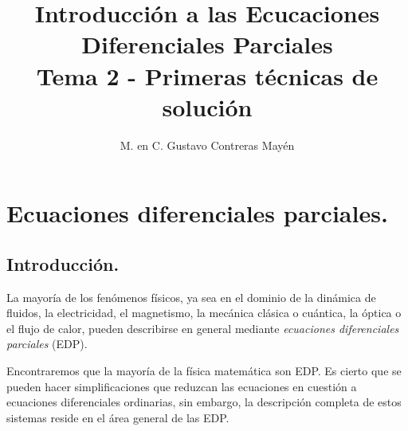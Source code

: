 
\title{Introducción a las Ecucaciones Diferenciales Parciales \\[0.3em]  \large{Tema 2 - Primeras técnicas de solución} \vspace{-3ex}}
\author{M. en C. Gustavo Contreras Mayén}
\date{ }

\pagestyle{fancy}
\fancyhf{}
\lhead{\leftmark}
\rfoot{\thepage}
\setlength{\headheight}{16pt}%


\vspace{-4cm}
\maketitle
\fontsize{14}{14}\selectfont
\tableofcontents
\newpage

\section{Ecuaciones diferenciales parciales.}

\subsection{Introducción.}

La mayoría de los fenómenos físicos, ya sea en el dominio de la dinámica de fluidos, la electricidad, el magnetismo, la mecánica clásica o cuántica, la óptica o el flujo de calor, pueden describirse en general mediante \emph{ecuaciones diferenciales parciales} (EDP).
\par
Encontraremos que la mayoría de la física matemática son EDP. Es cierto que se pueden hacer simplificaciones que reduzcan las ecuaciones en cuestión a ecuaciones diferenciales ordinarias, sin embargo, la descripción completa de estos sistemas reside en el área general de las EDP.
